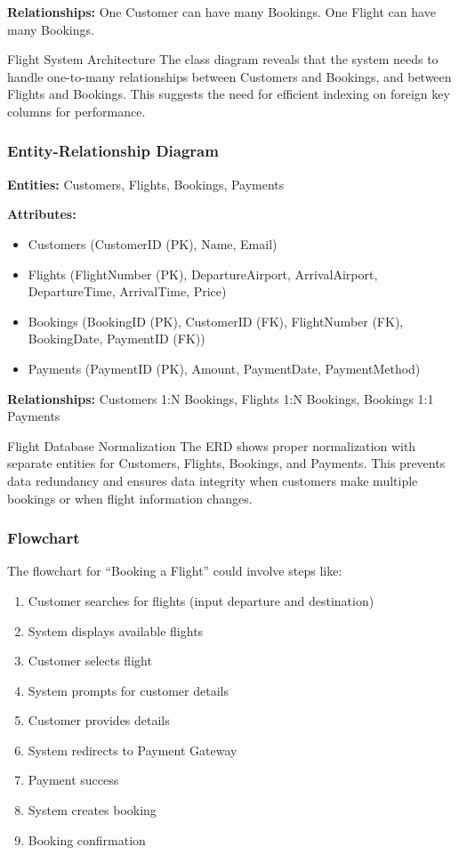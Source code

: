 \textbf{Relationships:} One Customer can have many Bookings. One Flight can have many Bookings.

\begin{examplecard}{Flight System Architecture}
  The class diagram reveals that the system needs to handle one-to-many relationships between Customers and Bookings, and between Flights and Bookings. This suggests the need for efficient indexing on foreign key columns for performance.
\end{examplecard}

\subsubsection{Entity-Relationship Diagram}

\textbf{Entities:} Customers, Flights, Bookings, Payments

\textbf{Attributes:}
\begin{itemize}
  \item Customers (CustomerID (PK), Name, Email)
  \item Flights (FlightNumber (PK), DepartureAirport, ArrivalAirport, DepartureTime, ArrivalTime, Price)
  \item Bookings (BookingID (PK), CustomerID (FK), FlightNumber (FK), BookingDate, PaymentID (FK))
  \item Payments (PaymentID (PK), Amount, PaymentDate, PaymentMethod)
\end{itemize}

\textbf{Relationships:} Customers 1:N Bookings, Flights 1:N Bookings, Bookings 1:1 Payments

\begin{examplecard}{Flight Database Normalization}
  The ERD shows proper normalization with separate entities for Customers, Flights, Bookings, and Payments. This prevents data redundancy and ensures data integrity when customers make multiple bookings or when flight information changes.
\end{examplecard}

\subsubsection{Flowchart}

The flowchart for ``Booking a Flight'' could involve steps like:
\begin{enumerate}
  \item Customer searches for flights (input departure and destination)
  \item System displays available flights
  \item Customer selects flight
  \item System prompts for customer details
  \item Customer provides details
  \item System redirects to Payment Gateway
  \item Payment success
  \item System creates booking
  \item Booking confirmation
\end{enumerate}

